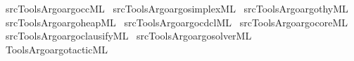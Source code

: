 \begin{isabellebody}
\isamarkupfalse%
\ {\isacartoucheopen}{\isachartilde}{\kern0pt}{\isachartilde}{\kern0pt}{\isacharslash}{\kern0pt}src{\isacharslash}{\kern0pt}Tools{\isacharslash}{\kern0pt}Argo{\isacharslash}{\kern0pt}argo{\isacharunderscore}{\kern0pt}cc{\isachardot}{\kern0pt}ML{\isacartoucheclose}\isanewline
{}\isamarkupfalse%
\ {\isacartoucheopen}{\isachartilde}{\kern0pt}{\isachartilde}{\kern0pt}{\isacharslash}{\kern0pt}src{\isacharslash}{\kern0pt}Tools{\isacharslash}{\kern0pt}Argo{\isacharslash}{\kern0pt}argo{\isacharunderscore}{\kern0pt}simplex{\isachardot}{\kern0pt}ML{\isacartoucheclose}\isanewline
{}\isamarkupfalse%
\ {\isacartoucheopen}{\isachartilde}{\kern0pt}{\isachartilde}{\kern0pt}{\isacharslash}{\kern0pt}src{\isacharslash}{\kern0pt}Tools{\isacharslash}{\kern0pt}Argo{\isacharslash}{\kern0pt}argo{\isacharunderscore}{\kern0pt}thy{\isachardot}{\kern0pt}ML{\isacartoucheclose}\isanewline
{}\isamarkupfalse%
\ {\isacartoucheopen}{\isachartilde}{\kern0pt}{\isachartilde}{\kern0pt}{\isacharslash}{\kern0pt}src{\isacharslash}{\kern0pt}Tools{\isacharslash}{\kern0pt}Argo{\isacharslash}{\kern0pt}argo{\isacharunderscore}{\kern0pt}heap{\isachardot}{\kern0pt}ML{\isacartoucheclose}\isanewline
{}\isamarkupfalse%
\ {\isacartoucheopen}{\isachartilde}{\kern0pt}{\isachartilde}{\kern0pt}{\isacharslash}{\kern0pt}src{\isacharslash}{\kern0pt}Tools{\isacharslash}{\kern0pt}Argo{\isacharslash}{\kern0pt}argo{\isacharunderscore}{\kern0pt}cdcl{\isachardot}{\kern0pt}ML{\isacartoucheclose}\isanewline
{}\isamarkupfalse%
\ {\isacartoucheopen}{\isachartilde}{\kern0pt}{\isachartilde}{\kern0pt}{\isacharslash}{\kern0pt}src{\isacharslash}{\kern0pt}Tools{\isacharslash}{\kern0pt}Argo{\isacharslash}{\kern0pt}argo{\isacharunderscore}{\kern0pt}core{\isachardot}{\kern0pt}ML{\isacartoucheclose}\isanewline
{}\isamarkupfalse%
\ {\isacartoucheopen}{\isachartilde}{\kern0pt}{\isachartilde}{\kern0pt}{\isacharslash}{\kern0pt}src{\isacharslash}{\kern0pt}Tools{\isacharslash}{\kern0pt}Argo{\isacharslash}{\kern0pt}argo{\isacharunderscore}{\kern0pt}clausify{\isachardot}{\kern0pt}ML{\isacartoucheclose}\isanewline
{}\isamarkupfalse%
\ {\isacartoucheopen}{\isachartilde}{\kern0pt}{\isachartilde}{\kern0pt}{\isacharslash}{\kern0pt}src{\isacharslash}{\kern0pt}Tools{\isacharslash}{\kern0pt}Argo{\isacharslash}{\kern0pt}argo{\isacharunderscore}{\kern0pt}solver{\isachardot}{\kern0pt}ML{\isacartoucheclose}\isanewline
\isanewline
{}\isamarkupfalse%
\ {\isacartoucheopen}Tools{\isacharslash}{\kern0pt}Argo{\isacharslash}{\kern0pt}argo{\isacharunderscore}{\kern0pt}tactic{\isachardot}{\kern0pt}ML{\isacartoucheclose}%
\endisatagML
{\isafoldML}%
%
\isadelimML
\isanewline
%
\endisadelimML
%
\isadelimtheory
\isanewline
%
\endisadelimtheory
%
\isatagtheory
{}\isamarkupfalse%
%
\endisatagtheory
{\isafoldtheory}%
%
\isadelimtheory
%
\endisadelimtheory
%
\end{isabellebody}%
